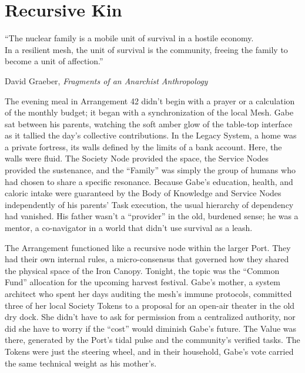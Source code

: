\chapter{Recursive Kin}
\label{chap:02}

\epigraph{“The nuclear family is a mobile unit of survival in a hostile economy.\\In a resilient mesh, the unit of survival is the community, freeing the family to become a unit of affection.”}{David Graeber, \textit{Fragments of an Anarchist Anthropology}}


The evening meal in Arrangement 42 didn't begin with a prayer or a calculation of the monthly budget; it began with a synchronization of the local Mesh. Gabe sat between his parents, watching the soft amber glow of the table-top interface as it tallied the day's collective contributions. In the Legacy System, a home was a private fortress, its walls defined by the limits of a bank account. Here, the walls were fluid. The Society Node provided the space, the Service Nodes provided the sustenance, and the ``Family'' was simply the group of humans who had chosen to share a specific resonance. Because Gabe's education, health, and caloric intake were guaranteed by the Body of Knowledge and Service Nodes independently of his parents' Task execution, the usual hierarchy of dependency had vanished. His father wasn't a ``provider'' in the old, burdened sense; he was a mentor, a co-navigator in a world that didn't use survival as a leash.

The Arrangement functioned like a recursive node within the larger Port. They had their own internal rules, a micro-consensus that governed how they shared the physical space of the Iron Canopy. Tonight, the topic was the ``Common Fund'' allocation for the upcoming harvest festival. Gabe's mother, a system architect who spent her days auditing the mesh's immune protocols, committed three of her local Society Tokens to a proposal for an open-air theater in the old dry dock. She didn't have to ask for permission from a centralized authority, nor did she have to worry if the ``cost'' would diminish Gabe's future. The Value was there, generated by the Port's tidal pulse and the community's verified tasks. The Tokens were just the steering wheel, and in their household, Gabe's vote carried the same technical weight as his mother's. 


